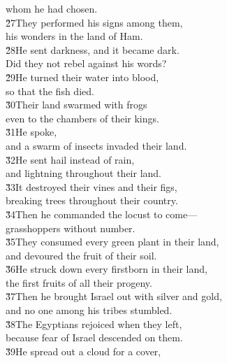 \begin{poetry}
\poemll    whom he had chosen. \\
\poeml \v{27}They performed his signs among them, \\
\poemll    his wonders in the land of Ham. \\
\poeml \v{28}He sent darkness, and it became dark. \\
\poemll    Did they not rebel against his words? \\
\poeml \v{29}He turned their water into blood, \\
\poemll    so that the fish died. \\
\poeml \v{30}Their land swarmed with frogs \\
\poemll    even to the chambers of their kings. \\
\poeml \v{31}He spoke, \\
\poemll    and a swarm of insects invaded their land. \\
\poeml \v{32}He sent hail instead of rain, \\
\poemll    and lightning throughout their land. \\
\poeml \v{33}It destroyed their vines and their figs, \\
\poemll    breaking trees throughout their country. \\
\poeml \v{34}Then he commanded the locust to come--- \\
\poemll    grasshoppers without number. \\
\poeml \v{35}They consumed every green plant in their land, \\
\poemll    and devoured the fruit of their soil. \\
\poeml \v{36}He struck down every firstborn in their land, \\
\poemll    the first fruits of all their progeny. \\
\poeml \v{37}Then he brought Israel out with silver and gold, \\
\poemll    and no one among his tribes stumbled. \\
\poeml \v{38}The Egyptians rejoiced when they left, \\
\poemll    because fear of Israel descended on them. \\
\poeml \v{39}He spread out a cloud for a cover, \\

\end{poetry}
